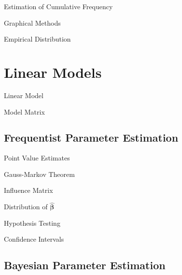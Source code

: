 \documentclass[11pt,a4paper]{article}
\begin{document}
\begin{remark}{Estimation of Cumulative Frequency}

\end{remark}

\begin{remark}{Graphical Methods}

\end{remark}

\begin{definition}{Empirical Distribution}

\end{definition}

\section{Linear Models}

\begin{definition}{Linear Model}

\end{definition}

\begin{definition}{Model Matrix}

\end{definition}

\subsection{Frequentist Parameter Estimation}

\begin{definition}{Point Value Estimates}
\end{definition}

\begin{theorem}{Gauss-Markov Theorem}

\end{theorem}

\begin{definition}{Influence Matrix}

\end{definition}

\begin{theorem}{Distribution of $\hat{\pmb\beta}$}

\end{theorem}

\begin{remark}{Hypothesis Testing}

\end{remark}

\begin{remark}{Confidence Intervals}

\end{remark}

\subsection{Bayesian Parameter Estimation}

\begin{definition}{}

\end{definition}
\end{document}
